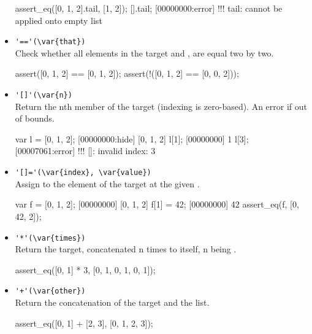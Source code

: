 \begin{itemize}
\begin{urbiscript}[firstnumber=last]
assert_eq([0, 1, 2].tail, [1, 2]);
[].tail;
[00000000:error] !!! tail: cannot be applied onto empty list
\end{urbiscript}

\item \lstinline|'=='(\var{that})|\\
Check whether all elements in the target and , are
equal two by two.

\begin{urbiscript}[firstnumber=last]
assert([0, 1, 2] == [0, 1, 2]);
assert(!([0, 1, 2] == [0, 0, 2]));
\end{urbiscript}

\item \lstinline|'[]'(\var{n})|\\
\label{sec:std-list-nth}
Return the nth member of the target (indexing is zero-based). An error
if out of bounds.

\begin{urbiscript}[firstnumber=last]
var l = [0, 1, 2];
[00000000:hide] [0, 1, 2]
l[1];
[00000000] 1
l[3];
[00007061:error] !!! []: invalid index: 3
\end{urbiscript}

\item \lstinline|'[]='(\var{index}, \var{value})|\\
\label{sec:std-list-setnth}
Assign  to the element of the target at the given .

\begin{urbiscript}[firstnumber=last]
var f = [0, 1, 2];
[00000000] [0, 1, 2]
f[1] = 42;
[00000000] 42
assert_eq(f, [0, 42, 2]);
\end{urbiscript}

\item \lstinline|'*'(\var{times})|\\
Return the target, concatenated n times to itself, n being .

\begin{urbiscript}[firstnumber=last]
assert_eq([0, 1] * 3, [0, 1, 0, 1, 0, 1]);
\end{urbiscript}

\item \lstinline|'+'(\var{other})|\\
Return the concatenation of the target and the  list.

\begin{urbiscript}[firstnumber=last]
assert_eq([0, 1] + [2, 3], [0, 1, 2, 3]);
\end{urbiscript}


\end{itemize}
